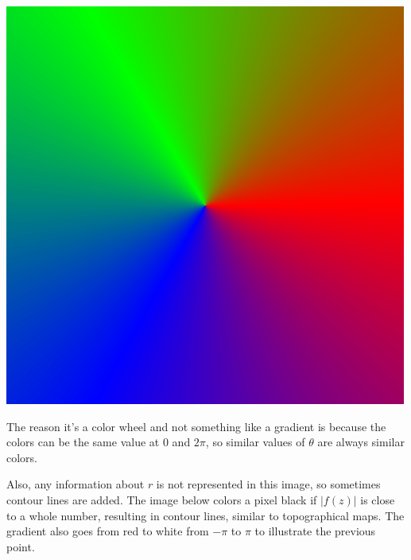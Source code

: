 \documentclass[xhtml, mathjax]{article}
\begin{document}
    \begin{center}
      \includegraphics{z_color.gif}
    \end{center}

    The reason it's a color wheel and not something like a gradient is because
    the colors can be the same value at $0$ and $2\pi$, so similar values of
    $\theta$ are always similar colors.

    Also, any information about $r$ is not represented in this image, so
    sometimes contour lines are added. The image below colors a pixel black if
    $|f(z)|$ is close to a whole number, resulting in contour lines, similar to
    topographical maps. The gradient also goes from red to white from $-\pi$ to
    $\pi$ to illustrate the previous point.
\end{document}
